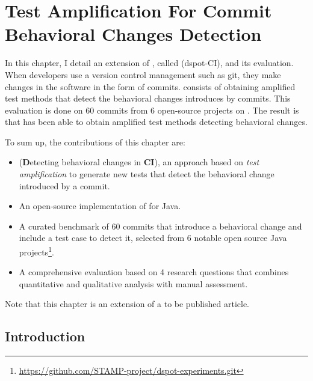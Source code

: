 \chapter{Test Amplification For Commit Behavioral Changes Detection}
\label{chap:dci}


\begin{chaptersummary}
	In this chapter, I detail an extension of \dspot, called \DCI(dspot-CI), and its evaluation.
	When developers use a version control management such as git, they make changes in the software in the form of commits.
	\DCI consists of obtaining amplified test methods that detect the behavioral changes introduces by commits.
	This evaluation is done on 60 commits from 6 open-source projects on \gh.
	The result is that \DCI has been able to obtain amplified test methods detecting  behavioral changes.
	
	To sum up, the contributions of this chapter are:
	\begin{itemize}
		\item \DCI (\textbf{D}etecting behavioral changes in \textbf{CI}), an approach based on \emph{test amplification} to generate new tests that detect the behavioral change introduced by a commit.
		\item An open-source implementation of \DCI for Java.
		\item A curated benchmark of 60 commits that introduce a behavioral change and include a test case to detect it, selected from 6 notable open source Java projects\footnote{\url{https://github.com/STAMP-project/dspot-experiments.git}}.
		\item A comprehensive evaluation based on 4 research questions that combines quantitative and qualitative analysis with manual assessment.
	\end{itemize}
	Note that this chapter is an extension of a to be published article\cite{}.
\end{chaptersummary}

\graphicspath{{.}{chapitres/behavioral-change-detection-for-commit/}}

\minitoc

\section{Introduction}
\label{sec:dci:introduction}

